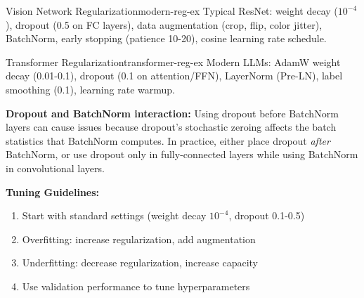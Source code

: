 \documentclass[../../main.tex]{subfiles}
\begin{document}
\begin{example}{Vision Network Regularization}{modern-reg-ex}
Typical ResNet: weight decay ($10^{-4}$), dropout (0.5 on FC layers), data augmentation (crop, flip, color jitter), BatchNorm, early stopping (patience 10-20), cosine learning rate schedule.
\end{example}

\begin{example}{Transformer Regularization}{transformer-reg-ex}
Modern LLMs: AdamW weight decay (0.01-0.1), dropout (0.1 on attention/FFN), LayerNorm (Pre-LN), label smoothing (0.1), learning rate warmup.
\end{example}

\begin{important}
\textbf{Dropout and BatchNorm interaction:} Using dropout before BatchNorm layers can cause issues because dropout's stochastic zeroing affects the batch statistics that BatchNorm computes. In practice, either place dropout \emph{after} BatchNorm, or use dropout only in fully-connected layers while using BatchNorm in convolutional layers.
\end{important}

\begin{principle}
\textbf{Tuning Guidelines:}
\begin{enumerate}
    \item Start with standard settings (weight decay $10^{-4}$, dropout 0.1-0.5)
    \item Overfitting: increase regularization, add augmentation
    \item Underfitting: decrease regularization, increase capacity
    \item Use validation performance to tune hyperparameters
\end{enumerate}
\end{principle}
\end{document}
